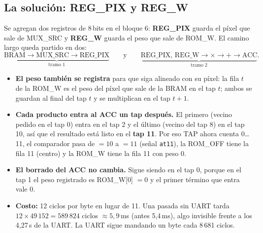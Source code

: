 \documentclass[11pt,a4paper]{article}
\newcommand{\sig}[1]{\texttt{\color{azul}#1}}
\begin{document}
\subsection{La solución: REG\_PIX y REG\_W}
Se agregan dos registros de 8\,bits en el bloque 6: \textbf{REG\_PIX} guarda el píxel que sale de MUX\_SRC y \textbf{REG\_W} guarda el peso que sale de ROM\_W. El camino largo queda partido en dos:
\[
\underbrace{\text{BRAM} \to \text{MUX\_SRC} \to \text{REG\_PIX}}_{\text{tramo 1}}
\qquad\text{y}\qquad
\underbrace{\text{REG\_PIX, REG\_W} \to \times \to + \to \text{ACC}}_{\text{tramo 2}} .
\]
\begin{itemize}
\item \textbf{El peso también se registra} para que siga alineado con su píxel: la fila $t$ de la ROM\_W es el peso del píxel que sale de la BRAM en el tap $t$; ambos se guardan al final del tap $t$ y se multiplican en el tap $t+1$.
\item \textbf{Cada producto entra al ACC un tap después.} El primero (vecino pedido en el tap 0) entra en el tap 2 y el último (vecino del tap 8) en el tap 10, así que el resultado está listo en el \textbf{tap 11}. Por eso TAP ahora cuenta 0…11, el comparador pasa de $=10$ a $=11$ (señal \sig{at11}), la ROM\_OFF tiene la fila 11 (centro) y la ROM\_W tiene la fila 11 con peso 0.
\item \textbf{El borrado del ACC no cambia.} Sigue siendo en el tap 0, porque en el tap 1 el peso registrado es ROM\_W[0] $= 0$ y el primer término que entra vale 0.
\item \textbf{Costo:} 12 ciclos por byte en lugar de 11. Una pasada sin UART tarda $12 \times 49\,152 = 589\,824$ ciclos $\approx 5{,}9$\,ms (antes 5,4\,ms), algo invisible frente a los 4,27\,s de la UART. La UART sigue mandando un byte cada 8\,681 ciclos.
\end{itemize}
\end{document}
